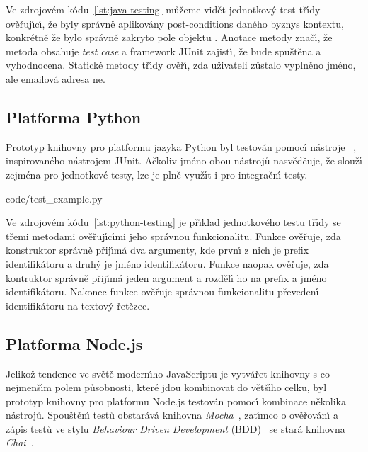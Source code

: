 Ve zdrojovém kódu~\ref{lst:java-testing}
můžeme vidět jednotkov\'y test tř\'{\i}dy  ověřuj\'{\i}c\'{\i},
že byly správně aplikovány post-conditions daného byznys kontextu, konkrétně
že bylo správně zakryto pole  objektu . Anotace
 metody  znač\'{\i},
že metoda obsahuje \textit{test case} a framework JUnit zajist\'{\i}, že bude spuštěna
a vyhodnocena. Statické metody tř\'{\i}dy  ověř\'{\i}, zda uživateli zůstalo
vyplněno jméno, ale emailová adresa ne.

\subsection{Platforma Python}

Prototyp knihovny pro platformu jazyka Python byl testován pomoc\'{\i}
nástroje ~\cite{pythonunittest}, inspirovaného nástrojem
JUnit. Ačkoliv jméno obou nástrojů nasvědčuje, že slouž\'{\i} zejména pro jednotkové testy,
lze je plně využ\'{\i}t i pro integračn\'{\i} testy.


{code/test_example.py}

Ve zdrojovém kódu~\ref{lst:python-testing} je př\'{\i}klad jednotkového testu tř\'{\i}dy
 se třemi metodami ověřuj\'{\i}c\'{\i}mi jeho správnou funkcionalitu.
Funkce  ověřuje, zda konstruktor správně přij\'{\i}má dva argumenty,
kde prvn\'{\i} z nich je prefix identifikátoru a druh\'y je jméno identifikátoru.
Funkce  naopak ověřuje, zda kontruktor správně přij\'{\i}má jeden
argument a rozděl\'{\i} ho na prefix a jméno identifikátoru.
Nakonec funkce  ověřuje správnou funkcionalitu převeden\'{\i}
identifikátoru na textov\'y řetězec.

\subsection{Platforma Node.js}

Jelikož tendence ve světě modern\'{\i}ho JavaScriptu je vytvářet knihovny s co nejmenš\'{\i}m polem působnosti,
které jdou kombinovat do větš\'{\i}ho celku, byl prototyp knihovny pro platformu Node.js testován pomoc\'{\i}
kombinace několika nástrojů. Spouštěn\'{\i} testů obstarává knihovna \textit{Mocha}~\cite{mocha}, zat\'{\i}mco
o ověřován\'{\i} a zápis testů ve stylu \textit{Behaviour Driven Development} (\gls{BDD})~\cite{solis2011study}
se stará knihovna \textit{Chai}~\cite{chai}.

